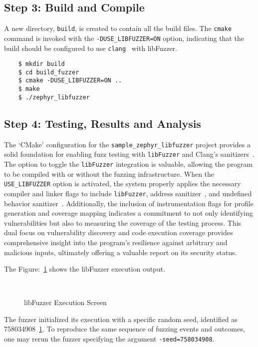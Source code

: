 \subsection*{Step 3: Build and Compile}
A new directory, \texttt{build}, is created to contain all the build files.
The \texttt{cmake} command is invoked with the \texttt{-DUSE\_LIBFUZZER=ON} option,
indicating that the build should be configured to
use \texttt{clang}~\cite{ClangCLa81:online} with libFuzzer.

\begin{verbatim}
    $ mkdir build
    $ cd build_fuzzer
    $ cmake -DUSE_LIBFUZZER=ON ..
    $ make
    $ ./zephyr_libfuzzer
\end{verbatim}

\subsection*{Step 4: Testing, Results and Analysis}
The `CMake' configuration for the \texttt{sample\_zephyr\_libfuzzer} project
provides a solid foundation for enabling fuzz testing with \texttt{libFuzzer}
and Clang's sanitizers~\cite{GitHubgo55:online}. The option to toggle the
\texttt{libFuzzer} integration is valuable, allowing the program to be compiled
with or without the fuzzing infrastructure. When the \texttt{USE\_LIBFUZZER}
option is activated, the system properly applies the necessary compiler and
linker flags to include \texttt{libFuzzer},
address sanitizer~\cite{GitHubgo55:online}, and
undefined behavior sanitizer~\cite{GitHubgo55:online}. Additionally,
the inclusion of instrumentation flags for profile generation and coverage
mapping indicates a commitment to not only identifying vulnerabilities but also
to measuring the coverage of the testing process. This dual focus on
vulnerability discovery and code execution coverage provides comprehensive
insight into the program's resilience against arbitrary and malicious inputs,
ultimately offering a valuable report on its security status.


The Figure:~\ref{fig:lib_fuzzer} shows the libFuzzer execution output.
\begin{figure}[H]
    \caption{libFuzzer Execution Screen}~\label{fig:lib_fuzzer}
\end{figure}
The fuzzer initialized its execution with a specific random seed,
identified as 758034908~\ref{fig:lib_fuzzer}. To reproduce the same
sequence of fuzzing events and outcomes, one may rerun the fuzzer
specifying the argument \texttt{-seed=758034908}.

